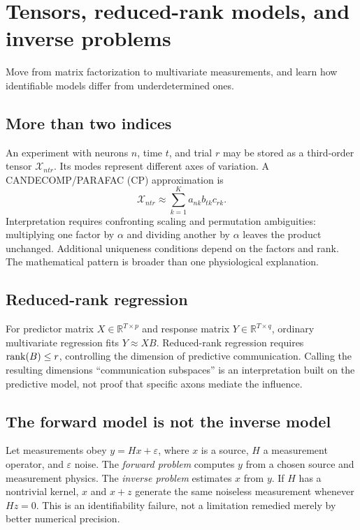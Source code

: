 \chapter{Tensors, reduced-rank models, and inverse problems}\label{ch:inverse}
\begin{readergoal}Move from matrix factorization to multivariate measurements, and learn how identifiable models differ from underdetermined ones.\end{readergoal}
\section{More than two indices}
An experiment with neurons $n$, time $t$, and trial $r$ may be stored as a third-order tensor $\mathcal X_{ntr}$. Its modes represent different axes of variation. A CANDECOMP/PARAFAC (CP) approximation is
\[\mathcal X_{ntr}\approx\sum_{k=1}^K a_{nk}b_{tk}c_{rk}.\]
Interpretation requires confronting scaling and permutation ambiguities: multiplying one factor by $\alpha$ and dividing another by $\alpha$ leaves the product unchanged. Additional uniqueness conditions depend on the factors and rank. The mathematical pattern is broader than one physiological explanation.

\section{Reduced-rank regression}
For predictor matrix $X\in\mathbb R^{T\times p}$ and response matrix $Y\in\mathbb R^{T\times q}$, ordinary multivariate regression fits $Y\approx XB$. Reduced-rank regression requires $\operatorname{rank}(B)\le r$, controlling the dimension of predictive communication. Calling the resulting dimensions ``communication subspaces'' is an interpretation built on the predictive model, not proof that specific axons mediate the influence.

\section{The forward model is not the inverse model}
Let measurements obey $y=Hx+\varepsilon$, where $x$ is a source, $H$ a measurement operator, and $\varepsilon$ noise. The \emph{forward problem} computes $y$ from a chosen source and measurement physics. The \emph{inverse problem} estimates $x$ from $y$. If $H$ has a nontrivial kernel, $x$ and $x+z$ generate the same noiseless measurement whenever $Hz=0$. This is an identifiability failure, not a limitation remedied merely by better numerical precision.

